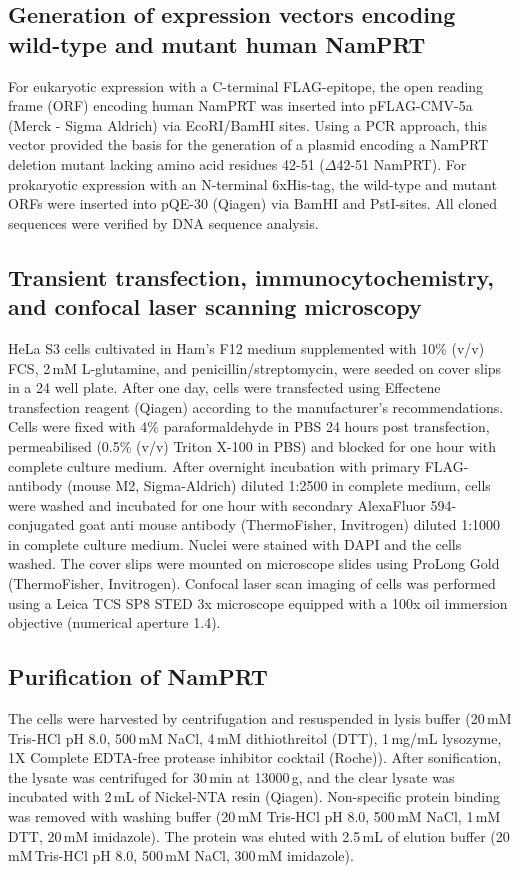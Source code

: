 \subsection{Generation of expression vectors encoding wild-type and mutant human NamPRT}

For eukaryotic expression with a C-terminal FLAG-epitope, the open reading frame (ORF) encoding human NamPRT was inserted into pFLAG-CMV-5a (Merck - Sigma Aldrich) via EcoRI/BamHI sites. Using a PCR approach, this vector provided the basis for the generation of a plasmid encoding a NamPRT deletion mutant lacking amino acid residues 42-51 ($\Delta$42-51 NamPRT). For prokaryotic expression with an N-terminal 6xHis-tag, the wild-type and mutant ORFs were inserted into pQE-30 (Qiagen) via BamHI and PstI-sites. All cloned sequences were verified by DNA sequence analysis.


\subsection{Transient transfection, immunocytochemistry, and confocal laser scanning microscopy}

HeLa S3 cells cultivated in Ham’s F12 medium supplemented with 10\% (v/v) FCS, 2\,mM L-glutamine, and penicillin/streptomycin, were seeded on cover slips in a 24 well plate. After one day, cells were transfected using Effectene transfection reagent (Qiagen) according to the manufacturer’s recommendations. Cells were fixed with 4\% paraformaldehyde in PBS 24 hours post transfection, permeabilised (0.5\% (v/v) Triton X-100 in PBS) and blocked for one hour with complete culture medium. After overnight incubation with primary FLAG-antibody (mouse M2, Sigma-Aldrich) diluted 1:2500 in complete medium, cells were washed and incubated for one hour with secondary AlexaFluor 594-conjugated goat anti mouse antibody (ThermoFisher, Invitrogen) diluted 1:1000 in complete culture medium. Nuclei were stained with DAPI and the cells washed. The cover slips were mounted on microscope slides using ProLong Gold (ThermoFisher, Invitrogen). Confocal laser scan imaging of cells was performed using a Leica TCS SP8 STED 3x microscope equipped with a 100x oil immersion objective (numerical aperture 1.4).


\subsection{Purification of NamPRT}

The cells were harvested by centrifugation and resuspended in lysis buffer (20\,mM Tris-HCl pH 8.0, 500\,mM NaCl, 4\,mM dithiothreitol (DTT), 1\,mg/mL lysozyme, 1X Complete EDTA-free protease inhibitor cocktail (Roche)). After sonification, the lysate was centrifuged for 30\,min at 13000\,g, and the clear lysate was incubated with 2\,mL of Nickel-NTA resin (Qiagen). Non-specific protein binding was removed with washing buffer (20\,mM Tris-HCl pH 8.0, 500\,mM NaCl, 1\,mM DTT, 20\,mM imidazole). The protein was eluted with 2.5\,mL of elution buffer (20 mM\,Tris-HCl pH 8.0, 500\,mM NaCl, 300\,mM imidazole).

